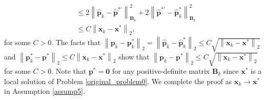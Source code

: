 \documentclass[aos]{imsart}
\numberwithin{equation}{section}
\theoremstyle{plain}
\begin{document}
\begin{appendix}
\begin{equation}
\begin{split}
            & \leq 2 \left\| \hat{\bm{p}}_{k} -\hat{\bm{p}}^{* \prime}  \right\|_{\bm{B}_{k}}^2 + 2 \left\| \hat{\bm{p}}^{* \prime} - \hat{\bm{p}}_{k}^{*} \right\|_{\bm{B}_{k}}^2 \\
            & \leq C \left\| \bm{x}_{k} - \bm{x}^{*} \right\|_2,
        \end{split}
    \end{equation}
    for some $C > 0$. The facts that $\left \| \bm{p}_{k} - \bm{p}_{k}^{*} \right\|_2 = \left \| \hat{\bm{p}}_{k} - \hat{\bm{p}}_{k}^{*} \right\|_2 \leq C \sqrt{\left\| \bm{x}_{k} - \bm{x}^{*} \right\|_2}$ and $\left\| \bm{p}_{k}^{*} - \bm{p}^{*} \right\|_2 \leq C \left\| \bm{x}_{k} - \bm{x}^{*} \right\|_2$ show that $\left \| \bm{p}_{k} - \bm{p}^{*} \right\|_2  \leq C \sqrt{\left\| \bm{x}_{k} - \bm{x}^{*} \right\|_2}$ for some $C > 0$. Note that $\bm{p}^{*} = \bm{0}$ for any positive-definite matrix $\bm{B}_{k}$ since $\bm{x}^{*}$ is a local solution of Problem \eqref{original_problem0}. We complete the proof as $\bm{x}_{k} \to \bm{x}^{*}$ in Assumption \ref{assump5}. 


\end{appendix}
\end{document}
